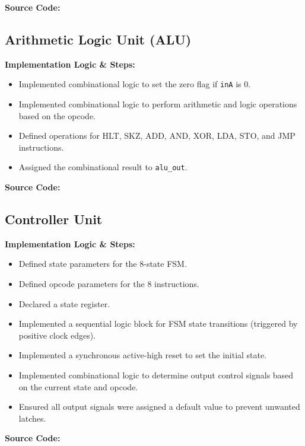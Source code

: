 \textbf{Source Code:}

\subsection{Arithmetic Logic Unit (ALU)}
\textbf{Implementation Logic \& Steps:}
\begin{itemize}
	\item Implemented combinational logic to set the zero flag if \texttt{inA} is 0.
	\item Implemented combinational logic to perform arithmetic and logic operations based on the opcode.
	\item Defined operations for HLT, SKZ, ADD, AND, XOR, LDA, STO, and JMP instructions.
	\item Assigned the combinational result to \texttt{alu\_out}.
\end{itemize}

\textbf{Source Code:}

\subsection{Controller Unit}
\textbf{Implementation Logic \& Steps:}
\begin{itemize}
	\item Defined state parameters for the 8-state FSM.
	\item Defined opcode parameters for the 8 instructions.
	\item Declared a state register.
	\item Implemented a sequential logic block for FSM state transitions (triggered by positive clock edges).
	\item Implemented a synchronous active-high reset to set the initial state.
	\item Implemented combinational logic to determine output control signals based on the current state and opcode.
	\item Ensured all output signals were assigned a default value to prevent unwanted latches.
\end{itemize}

\textbf{Source Code:}


